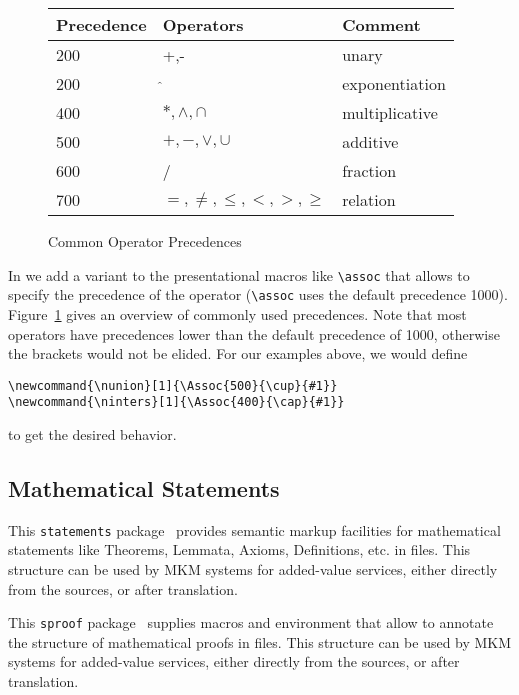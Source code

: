 \begin{figure}[htb]
\begin{center}
  \begin{tabular}{|l|l|l|}\hline
    Precedence & Operators                  & Comment\\\hline\hline
    200    & +,-                        & unary \\\hline
    200    & $\hat{}$                   & exponentiation \\\hline
    400    & $*,\land,\cap$             & multiplicative \\\hline
    500    & $+,-,\lor,\cup$            & additive\\\hline
    600    & /                          & fraction \\\hline
    700    & $=, \ne, \leq, <, >, \geq$ & relation\\\hline
  \end{tabular}
\end{center}
\caption{Common Operator Precedences}\label{fig:precedence}
\end{figure}

\DescribeMacro{\Assoc} In {\stex} we add a variant to the presentational macros like
\verb|\assoc| that allows to specify the precedence of the operator (\verb|\assoc| uses the
default precedence 1000). Figure~\ref{fig:precedence} gives an overview of commonly used
precedences. Note that most operators have precedences lower than the default precedence
of 1000, otherwise the brackets would not be elided.  For our examples above, we would
define
\begin{verbatim}
\newcommand{\nunion}[1]{\Assoc{500}{\cup}{#1}}
\newcommand{\ninters}[1]{\Assoc{400}{\cap}{#1}}
\end{verbatim}
to get the desired behavior.

\subsection{Mathematical Statements}

 
This \verb|statements| package~\cite{Kohlhase:smms06} provides semantic markup facilities
for mathematical statements like Theorems, Lemmata, Axioms, Definitions, etc. in {\stex}
files. This structure can be used by MKM systems for added-value services, either directly
from the {\sTeX} sources, or after translation.

This \verb|sproof| package~\cite{Kohlhase:smp06} supplies macros and environment that
allow to annotate the structure of mathematical proofs in {\stex} files. This structure
can be used by MKM systems for added-value services, either directly from the {\sTeX}
sources, or after translation.

